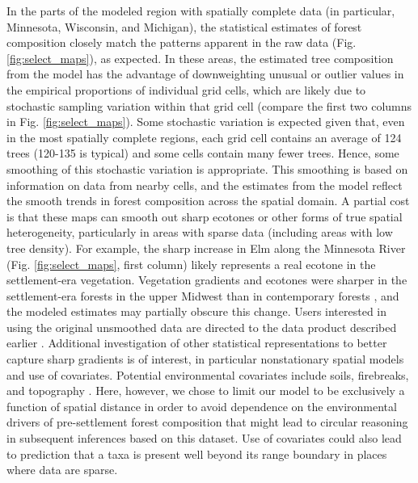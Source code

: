 \documentclass[10pt,letterpaper]{article}
\begin{document}
In the parts of the modeled region with spatially
complete data (in particular, Minnesota, Wisconsin, and Michigan),
the statistical estimates of forest composition closely match the
patterns apparent in the raw data (Fig. \ref{fig:select_maps}), as
expected. In these areas, the estimated tree composition from the
model has the advantage of downweighting unusual or outlier values
in the empirical proportions of individual grid cells, which are likely
due to stochastic sampling variation within that grid cell (compare
the first two columns in Fig. \ref{fig:select_maps}). Some stochastic
variation is expected given that, even in the most spatially complete
regions, each grid cell contains an average of 124 trees (120-135
is typical) \cite{goring2015composition} and some cells contain
many fewer trees. Hence, some smoothing of this stochastic variation
is appropriate. This smoothing is based on information on data from
nearby cells, and the estimates from the model reflect the smooth
trends in forest composition across the spatial domain. A partial
cost is that these maps can smooth out sharp ecotones or other forms
of true spatial heterogeneity, particularly in areas with sparse data
(including areas with low tree density). For example, the sharp increase
in Elm along the Minnesota River (Fig. \ref{fig:select_maps}, first
column) likely represents a real ecotone in the settlement-era vegetation.
Vegetation gradients and ecotones were sharper in the settlement-era
forests in the upper Midwest than in contemporary forests \cite{goring2015composition},
and the modeled estimates may partially obscure this change. Users
interested in using the original unsmoothed data are directed to the
data product described earlier \cite{Gori:etal:data:2016}. Additional
investigation of other statistical representations to better capture
sharp gradients is of interest, in particular nonstationary spatial
models and use of covariates. Potential environmental covariates include
soils, firebreaks, and topography \cite{grimm1984fire,shea2014reconstructing}.
Here, however, we chose to limit our model to be exclusively a function
of spatial distance in order to avoid dependence on the environmental
drivers of pre-settlement forest composition that might lead to circular
reasoning in subsequent inferences based on this dataset. Use of covariates
could also lead to prediction that a taxa is present well beyond its
range boundary in places where data are sparse.
\end{document}
